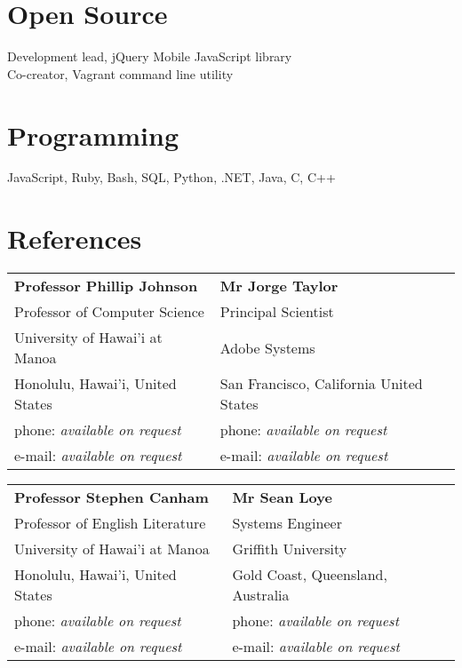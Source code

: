 \documentclass[margin,line]{resume}
\begin{document}
\begin{resume}
    \section{\mysidestyle Open Source}

    Development lead, jQuery Mobile JavaScript library
    \vspace{1mm}\\
    Co-creator, Vagrant command line utility
    \vspace{1mm}\\

    \section{\mysidestyle Programming}

    JavaScript, Ruby, Bash, SQL, Python, .NET, Java, C, C++

\section{\mysidestyle References}

\begin{tabular}{@{}p{6cm}p{6cm}}
\textbf{Professor Phillip Johnson}      &  \textbf{Mr Jorge Taylor }                \\
Professor of Computer Science           &  Principal Scientist                      \\
University of Hawai'i at Manoa          &  Adobe Systems                            \\
Honolulu, Hawai'i, United States        &  San Francisco, California United States  \\
phone: \textsl{available on request}    &  phone: \textsl{available on request}     \\
e-mail: \textsl{available on request}   &  e-mail: \textsl{available on request}    \\
\end{tabular}

\begin{tabular}{@{}p{6cm}p{6cm}}
\textbf{Professor Stephen Canham}       &  \textbf{Mr Sean Loye}                    \\
Professor of English Literature         &  Systems Engineer                         \\
University of Hawai'i at Manoa          &  Griffith University                      \\
Honolulu, Hawai'i, United States        &  Gold Coast, Queensland, Australia        \\
phone: \textsl{available on request}    &  phone: \textsl{available on request}     \\
e-mail: \textsl{available on request}   &  e-mail: \textsl{available on request}    \\
\end{tabular}



\end{resume}
\end{document}
